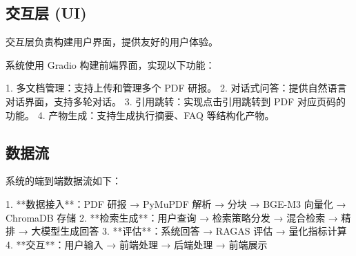 \subsection{交互层 (UI)}

交互层负责构建用户界面，提供友好的用户体验。

系统使用 Gradio 构建前端界面，实现以下功能：

1. 多文档管理：支持上传和管理多个 PDF 研报。
2. 对话式问答：提供自然语言对话界面，支持多轮对话。
3. 引用跳转：实现点击引用跳转到 PDF 对应页码的功能。
4. 产物生成：支持生成执行摘要、FAQ 等结构化产物。

\subsection{数据流}

系统的端到端数据流如下：

1. **数据接入**：PDF 研报 → PyMuPDF 解析 → 分块 → BGE-M3 向量化 → ChromaDB 存储
2. **检索生成**：用户查询 → 检索策略分发 → 混合检索 → 精排 → 大模型生成回答
3. **评估**：系统回答 → RAGAS 评估 → 量化指标计算
4. **交互**：用户输入 → 前端处理 → 后端处理 → 前端展示
